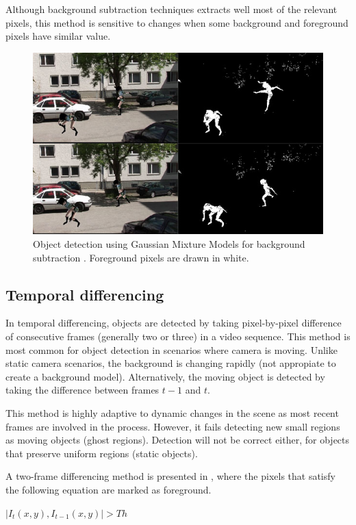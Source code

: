 Although background subtraction techniques extracts well most of the relevant
pixels, this method is sensitive to changes when some background and foreground
pixels have similar value.

\begin{figure}[h!]
	\centering
		\includegraphics[width=0.7\linewidth]{Figures/bg_sub.jpg}
	\caption[Object detection using Gaussian Mixture Models for background
	subtraction]
	{Object detection using Gaussian Mixture Models for background
	subtraction \cite{Pham2010}. Foreground pixels are drawn in white.}
	\label{fig::bg_sub}
\end{figure}

\subsection{Temporal differencing}

In temporal differencing, objects are detected by taking pixel-by-pixel
difference of consecutive frames (generally two or three) in a video sequence.
This method is most common for object detection in scenarios where camera
is moving. Unlike static camera scenarios, the background is changing rapidly
(not appropiate to create a background model). Alternatively,
the moving object is detected by taking the difference between frames $t - 1$
and $t$.

This method is highly adaptive to dynamic changes in the scene as most recent
frames are involved in the process. However, it fails detecting new small
regions as moving objects (ghost regions). Detection will not be correct either,
for objects that preserve uniform regions (static objects).

A two-frame differencing method is presented in \cite{Lipton1998a}, where the
pixels that satisfy the following equation are marked as foreground.\\
\centerline{$|I_t(x,y), I_{t-1}(x,y)|>Th$}

